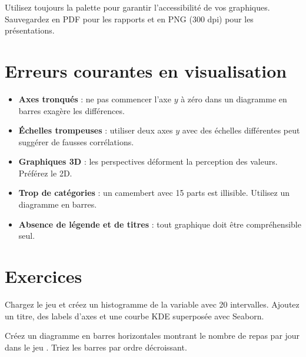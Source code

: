 \begin{bonnepratique}
Utilisez toujours la palette  pour garantir l'accessibilit\'e de vos graphiques. Sauvegardez en PDF pour les rapports et en PNG (300 dpi) pour les pr\'esentations.
\end{bonnepratique}

\section{Erreurs courantes en visualisation}

\begin{attention}
\begin{itemize}
    \item \textbf{Axes tronqu\'es} : ne pas commencer l'axe $y$ \`a z\'ero dans un diagramme en barres exag\`ere les diff\'erences.
    \item \textbf{\'Echelles trompeuses} : utiliser deux axes $y$ avec des \'echelles diff\'erentes peut sugg\'erer de fausses corr\'elations.
    \item \textbf{Graphiques 3D} : les perspectives d\'eforment la perception des valeurs. Pr\'ef\'erez le 2D.
    \item \textbf{Trop de cat\'egories} : un camembert avec 15 parts est illisible. Utilisez un diagramme en barres.
    \item \textbf{Absence de l\'egende et de titres} : tout graphique doit \^etre compr\'ehensible seul.
\end{itemize}
\end{attention}

\section{Exercices}

\begin{exercice}[$\star$]
Chargez le jeu  et cr\'eez un histogramme de la variable  avec 20 intervalles. Ajoutez un titre, des labels d'axes et une courbe KDE superpos\'ee avec Seaborn.
\end{exercice}

\begin{exercice}[$\star$]
Cr\'eez un diagramme en barres horizontales montrant le nombre de repas par jour dans le jeu . Triez les barres par ordre d\'ecroissant.
\end{exercice}


